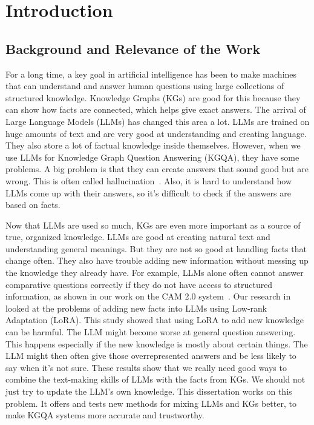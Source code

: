 \chapter{Introduction}
\label{chap:introduction}

\section{Background and Relevance of the Work}
\label{sec:intro:background}
For a long time, a key goal in artificial intelligence has been to make machines that can understand and answer human questions using large collections of structured knowledge. Knowledge Graphs (KGs) are good for this because they can show how facts are connected, which helps give exact answers. The arrival of Large Language Models (LLMs) has changed this area a lot. LLMs are trained on huge amounts of text and are very good at understanding and creating language. They also store a lot of factual knowledge inside themselves. However, when we use LLMs for Knowledge Graph Question Answering (KGQA), they have some problems. A big problem is that they can create answers that sound good but are wrong. This is often called hallucination~\cite{lin-etal-2022-truthfulqa, DBLP:conf/emnlp/RobertsRS20, DBLP:journals/csur/JiLFYSXIBMF23, DBLP:journals/corr/abs-2401-01313}. Also, it is hard to understand how LLMs come up with their answers, so it's difficult to check if the answers are based on facts.

Now that LLMs are used so much, KGs are even more important as a source of true, organized knowledge. LLMs are good at creating natural text and understanding general meanings. But they are not so good at handling facts that change often. They also have trouble adding new information without messing up the knowledge they already have. For example, LLMs alone often cannot answer comparative questions correctly if they do not have access to structured information, as shown in our work on the CAM 2.0 system~\cite{DBLP:conf/coling/ShalloufHSVMPBN24}. Our research in~\cite{pletenev-etal-2025-much} looked at the problems of adding new facts into LLMs using Low-rank Adaptation (LoRA). This study showed that using LoRA to add new knowledge can be harmful. The LLM might become worse at general question answering. This happens especially if the new knowledge is mostly about certain things. The LLM might then often give those overrepresented answers and be less likely to say when it's not sure. These results show that we really need good ways to combine the text-making skills of LLMs with the facts from KGs. We should not just try to update the LLM's own knowledge. This dissertation works on this problem. It offers and tests new methods for mixing LLMs and KGs better, to make KGQA systems more accurate and trustworthy.

